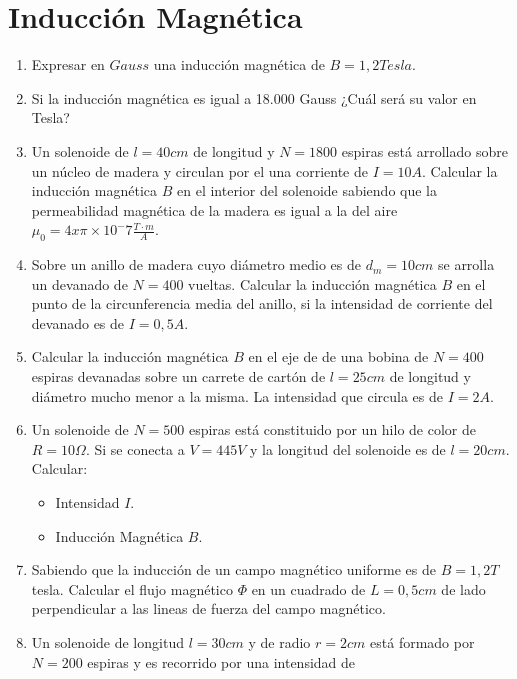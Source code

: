 \documentclass[../main]{subfiles}
\begin{document}
\chapter{Inducción Magnética}
\begin{enumerate}
  \item Expresar en $Gauss$ una inducción magnética de $B=1,2  Tesla$.
  \item Si la inducción magnética es igual a 18.000 Gauss ¿Cuál será
    su valor en Tesla?
  \item Un solenoide de $l=40cm$ de longitud y $N=1800$ espiras está
    arrollado sobre un núcleo de madera y circulan por el una
    corriente de $I=10A$. Calcular la inducción magnética $B$ en el
    interior del solenoide sabiendo que la permeabilidad magnética de
    la madera es igual a la del aire $\mu_0=4x\pi \times 10^-7
    \frac{T \cdot m}{A}$.
  \item Sobre un anillo de madera cuyo diámetro medio es de
    $d_m=10cm$ se arrolla un devanado de $N=400$ vueltas. Calcular la
    inducción magnética $B$ en el punto de la circunferencia media
    del anillo, si la intensidad de corriente del devanado es de $I=0,5A$.
  \item Calcular la inducción magnética $B$ en el eje de de una
    bobina de $N=400$ espiras devanadas sobre un carrete de cartón de
    $l=25cm$ de longitud y diámetro mucho menor a la misma. La
    intensidad que circula es de $I=2A$.
  \item Un solenoide de $N=500$ espiras está constituido por un hilo
    de color de $R=10\Omega$. Si se conecta a $V=445V$ y la longitud
    del solenoide es de $l=20cm$. Calcular:
    \begin{itemize}
      \item Intensidad $I$.
      \item Inducción Magnética $B$.
    \end{itemize}
  \item Sabiendo que la inducción de un campo magnético uniforme es
    de $B=1,2T$ tesla. Calcular el flujo magnético $\Phi$ en un
    cuadrado de $L=0,5cm$ de lado perpendicular a las lineas de
    fuerza del campo magnético.
  \item Un solenoide de longitud $l=30cm$ y de radio $r=2cm$ está
    formado por $N=200$ espiras y es recorrido por una intensidad de

\end{enumerate}
\end{document}
